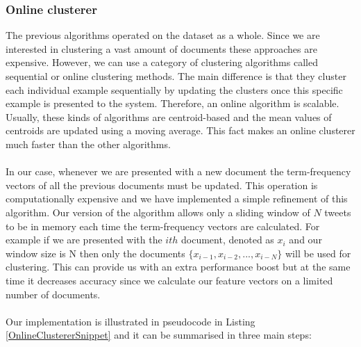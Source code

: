 \subsubsection{Online clusterer}
The previous algorithms operated on the dataset as a whole. Since we are interested in clustering a vast amount of documents these approaches are expensive. However, we can use a category of clustering algorithms called sequential or online clustering methods. The main difference is that they cluster each individual example sequentially by updating the clusters once this specific example is presented to the system. Therefore, an online algorithm is scalable. Usually, these kinds of algorithms are centroid-based and the mean values of centroids are updated using a moving average. This fact makes an online clusterer much faster than the other algorithms.\\\\
In our case, whenever we are presented with a new document the term-frequency vectors of all the previous documents must be updated. This operation is computationally expensive and we have implemented a simple refinement of this algorithm. Our version of the algorithm allows only a sliding window of $N$ tweets to be in memory each time the term-frequency vectors are calculated. For example if we are presented with the $ith$ document, denoted as $x_i$ and our window size is N then only the documents $\{ x_{i-1}, x_{i-2},..., x_{i-N}\}$ will be used for clustering. This can provide us with an extra performance boost but at the same time it decreases accuracy since we calculate our feature vectors on a limited number of documents.\\\\
Our implementation is illustrated in pseudocode in Listing \ref{OnlineClustererSnippet} and it can be summarised in three main steps: 

